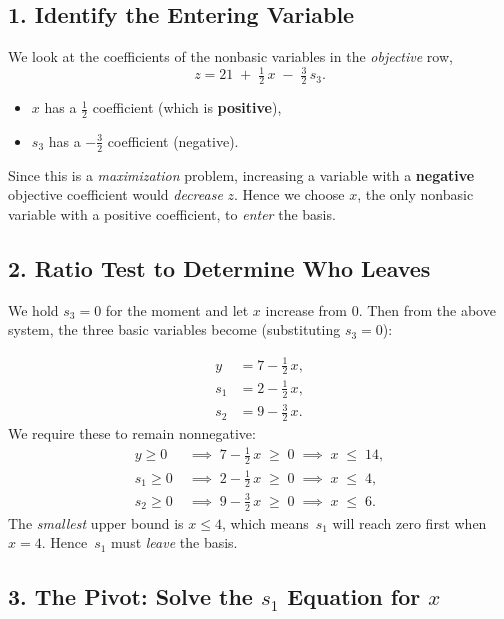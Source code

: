 \subsection*{1. Identify the Entering Variable}

We look at the coefficients of the nonbasic variables in the \emph{objective} row,
\[
z = 21 \;+\; \tfrac12\,x \;-\;\tfrac32\,s_3.
\]
\begin{itemize}
  \item \(x\) has a \(\tfrac12\) coefficient (which is \textbf{positive}), 
  \item \(s_3\) has a \(-\tfrac32\) coefficient (negative).
\end{itemize}
Since this is a \emph{maximization} problem, increasing a variable with a \textbf{negative} objective coefficient would \emph{decrease} \(z\).  
Hence we choose \(x\), the only nonbasic variable with a positive coefficient, to \emph{enter} the basis.

\subsection*{2. Ratio Test to Determine Who Leaves}

We hold \(s_3=0\) for the moment and let \(x\) increase from \(0\).  
Then from the above system, the three basic variables become (substituting \(s_3=0\)):

\[
\begin{aligned}
y   &= 7 - \tfrac12\,x,\\
s_1 &= 2 - \tfrac12\,x,\\
s_2 &= 9 - \tfrac32\,x.
\end{aligned}
\]
We require these to remain nonnegative:
\[
\begin{aligned}
y \ge 0 \;&\implies\; 7 - \tfrac12\,x \;\ge\; 0 \;\implies\; x \;\le\; 14,\\
s_1 \ge 0 \;&\implies\; 2 - \tfrac12\,x \;\ge\; 0 \;\implies\; x \;\le\; 4,\\
s_2 \ge 0 \;&\implies\; 9 - \tfrac32\,x \;\ge\; 0 \;\implies\; x \;\le\; 6.
\end{aligned}
\]
The \emph{smallest} upper bound is \(x \le 4\), which means \(\,s_1\) will reach zero first when \(x=4\).  
Hence \(\,s_1\) must \emph{leave} the basis.

\subsection*{3. The Pivot: Solve the \(s_1\) Equation for \(x\)}

